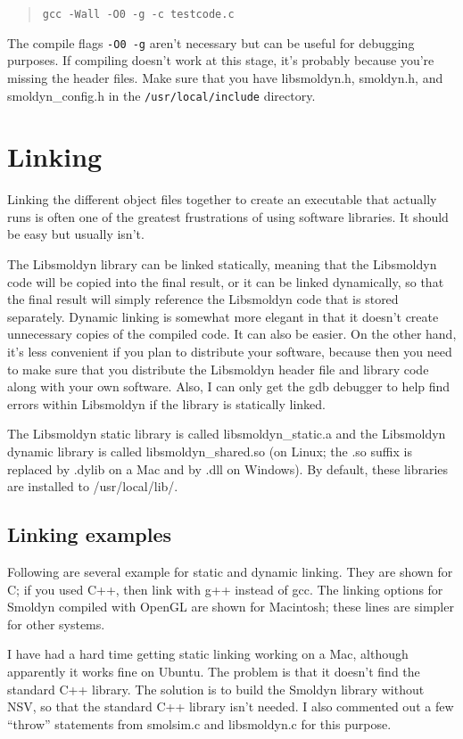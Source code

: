 \documentclass {book}
\begin{document}
\begin{quote}
\lstinline{gcc -Wall -O0 -g -c testcode.c}
\end{quote}

The compile flags \texttt{-O0 -g} aren't necessary but can be useful for debugging purposes.  If compiling doesn't work at this stage, it's probably because you're missing the header files.  Make sure that you have libsmoldyn.h, smoldyn.h, and smoldyn\_config.h in the \texttt{/usr/local/include} directory.


\section{Linking}

Linking the different object files together to create an executable that actually runs is often one of the greatest frustrations of using software libraries.  It should be easy but usually isn't.

The Libsmoldyn library can be linked statically, meaning that the Libsmoldyn code will be copied into the final result, or it can be linked dynamically, so that the final result will simply reference the Libsmoldyn code that is stored separately.  Dynamic linking is somewhat more elegant in that it doesn't create unnecessary copies of the compiled code.  It can also be easier.  On the other hand, it's less convenient if you plan to distribute your software, because then you need to make sure that you distribute the Libsmoldyn header file and library code along with your own software.  Also, I can only get the gdb debugger to help find errors within Libsmoldyn if the library is statically linked.

The Libsmoldyn static library is called libsmoldyn\_static.a and the Libsmoldyn dynamic library is called libsmoldyn\_shared.so (on Linux; the .so suffix is replaced by .dylib on a Mac and by .dll on Windows).  By default, these libraries are installed to /usr/local/lib/.

\subsection*{Linking examples}

Following are several example for static and dynamic linking.  They are shown for C; if you used C++, then link with g++ instead of gcc.  The linking options for Smoldyn compiled with OpenGL are shown for Macintosh; these lines are simpler for other systems.

I have had a hard time getting static linking working on a Mac, although apparently it works fine on Ubuntu.  The problem is that it doesn't find the standard C++ library.  The solution is to build the Smoldyn library without NSV, so that the standard C++ library isn't needed.  I also commented out a few ``throw'' statements from smolsim.c and libsmoldyn.c for this purpose.
\end{document}
